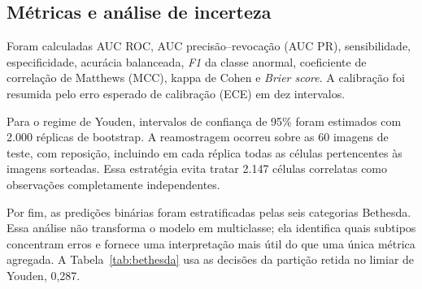 \subsection{Métricas e análise de incerteza}

Foram calculadas AUC ROC, AUC precisão--revocação (AUC PR), sensibilidade,
especificidade, acurácia balanceada, \emph{F1} da classe anormal, coeficiente de
correlação de Matthews (MCC), kappa de Cohen e \emph{Brier score}. A calibração
foi resumida pelo erro esperado de calibração (ECE) em dez intervalos.

Para o regime de Youden, intervalos de confiança de 95\% foram estimados com
2.000 réplicas de bootstrap. A reamostragem ocorreu sobre as 60 imagens de
teste, com reposição, incluindo em cada réplica todas as células pertencentes
às imagens sorteadas. Essa estratégia evita tratar 2.147 células correlatas
como observações completamente independentes.

Por fim, as predições binárias foram estratificadas pelas seis categorias
Bethesda. Essa análise não transforma o modelo em multiclasse; ela identifica
quais subtipos concentram erros e fornece uma interpretação mais útil do que
uma única métrica agregada. A Tabela~\ref{tab:bethesda} usa as decisões da
partição retida no limiar de Youden, 0,287.
